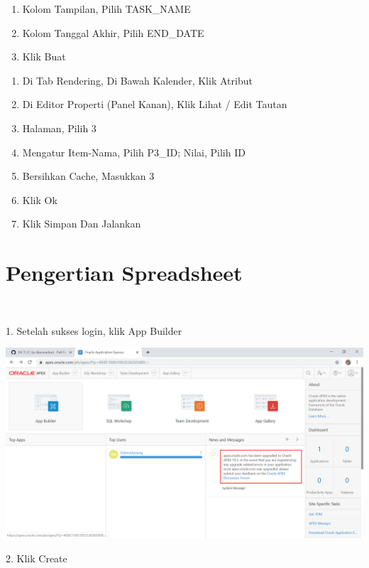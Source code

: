 \documentclass{article}
\begin{document}
\begin{enumerate}
\item Kolom Tampilan, Pilih TASK_NAME
\item Kolom Tanggal Akhir, Pilih END_DATE
\item Klik Buat

\end{enumerate}
\begin{enumerate}
    \item Di Tab Rendering, Di Bawah Kalender, Klik Atribut
    \item Di Editor Properti (Panel Kanan), Klik Lihat / Edit Tautan
    \item Halaman, Pilih 3
    \item Mengatur Item-Nama, Pilih P3_ID; Nilai, Pilih ID
    \item Bersihkan Cache, Masukkan 3
    \item Klik Ok
    \item Klik Simpan Dan Jalankan\\

\end{enumerate}

\section{Pengertian Spreadsheet}
\usepackage{Spreadsheet: Memungkinkan Pengguna Untuk Menyimpan Berbagai Informasi Yang Sangat Lengkap, Pada Setiap Kolomnya Bisa Menyimpan Berbagai Data Informasi Yang Berbeda Dari Informasi Yang Di Perlukan.}\\
\usepackage{App From Spreadsheet Disini Berupa Beberapa Project Dan Nama Tugas Nya Serta Keterangan Lainnya Seperti Tanggal Mulai, Tanggal Selesai, Status, Di Ttd Oleh,Biaya, Budget Tersedia, Dan Lebih Kurangnya Dari Budget.}


    \item 1.  Setelah sukses login, klik App Builder

\begin{center}
    \includegraphics[width=10cm\textwidth]{gambar/1.png}
    \end{center}
    \newpage
    \item 2. Klik Create
\end{document}
